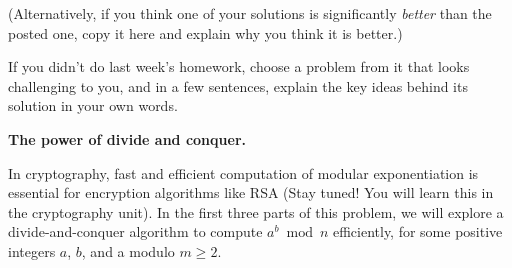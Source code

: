 \documentclass[11pt,addpoints,answers]{exam}
\begin{document}
\begin{questions}
  (Alternatively, if you think one of your solutions is significantly \emph{better} than the posted one, copy it here and explain why you think it is better.)

  If you didn't do last week's homework, choose a problem from it that looks challenging to you, and in a few sentences, explain the key ideas behind its solution in your own words.

  \begin{solution}
        
  \end{solution}
  
 \question \textbf{The power of divide and conquer.}

 In cryptography, fast and efficient computation of modular exponentiation is essential for encryption algorithms like RSA (Stay tuned! You will learn this in the cryptography unit). In the first three parts of this problem, we will explore a divide-and-conquer algorithm to compute $a^b \bmod n$ efficiently, for some positive integers $a$, $b$, and a modulo $m \geq 2$. 

\end{questions}
\end{document}
